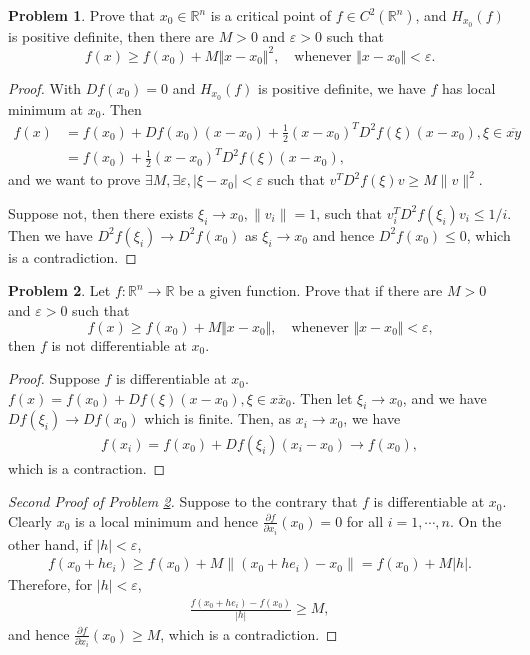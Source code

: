 \documentclass[11pt]{article}
\theoremstyle{definition}
\newtheorem{problem}{Problem}
\theoremstyle{definition}
\begin{document}
\medskip

\begin{problem}
Prove that $x_0\in\mathbb{R}^n$ is a critical point of $f\in C^2(\mathbb{R}^n)$, and $H_{x_0}(f)$ is positive definite, then there are $M>0$ and $\varepsilon>0$ such that
$$
f(x)\geq f(x_0)+M\Vert x-x_0\Vert^2,
\quad \text{whenever $\Vert x-x_0\Vert<\varepsilon$.}
$$
\end{problem}
\begin{proof}
With $Df(x_0) = 0$ and $H_{x_0}(f)$ is positive definite, we have $f$ has local minimum at $x_0$. Then 
\begin{align*}
    f(x) & = f(x_0) + Df(x_0)(x-x_0) + \frac{1}{2} (x-x_0)^T D^2f(\xi) (x-x_0), \xi \in \overline{xy} \\
    & = f(x_0) + \frac{1}{2} (x-x_0)^T D^2f(\xi) (x-x_0),
\end{align*}
and we want to prove $\exists M, \exists \varepsilon, |\xi - x_0| < \varepsilon$ such that $v^T D^2f(\xi)v \geq M\|v\|^2$. 

Suppose not, then there exists $\xi_i \to x_0, \|v_i\| = 1$, such that $v_i^T D^2f(\xi_i)v_i \leq 1/i$. Then we have $D^2f(\xi_i) \to D^2f(x_0)$ as $\xi_i\to x_0$ and hence $D^2f(x_0) \leq 0$, which is a contradiction.
\end{proof}

\medskip

\begin{problem}\label{problem_41}
Let $f:\mathbb{R}^n\to\mathbb{R}$ be a given function. Prove that if there are $M>0$ and $\varepsilon>0$ such that
$$
f(x)\geq f(x_0)+M\Vert x-x_0\Vert,
\quad \text{whenever $\Vert x-x_0\Vert<\varepsilon$,}
$$
then $f$ is not differentiable at $x_0$.
\end{problem}

\begin{proof}
Suppose $f$ is differentiable at $x_0$. $f(x) = f(x_0) + D f(\xi) (x-x_0), \xi \in \overline{x x_0}$. Then let $\xi_i\to x_0$, and we have $D f(\xi_i) \to D f(x_0)$ which is finite. Then, as $x_i\to x_0$, we have 
\begin{align*}
    f(x_i) = f(x_0) + D f(\xi_i)(x_i - x_0) \to f(x_0),
\end{align*}
which is a contraction.
\end{proof}

\medskip

\begin{proof}[Second Proof of Problem \ref{problem_41}]
Suppose to the contrary that $f$ is differentiable at $x_0$. Clearly $x_0$ is a local minimum and hence $\frac{\partial f}{\partial x_i}(x_0) = 0$ for all $i = 1, \cdots, n$. On the other hand, if $|h| < \varepsilon$,
\begin{align*}
    f(x_0 + he_i) \geq f(x_0) + M \left\| (x_0 + he_i) - x_0 \right\| = f(x_0) + M|h|.
\end{align*}
Therefore, for $|h| < \varepsilon$,
\begin{align*}
    \frac{f(x_0 + he_i) - f(x_0)}{|h|} \geq M,
\end{align*}
and hence $\frac{\partial f}{\partial x_i}(x_0) \geq M$, which is a contradiction.
\end{proof}
\end{document}
